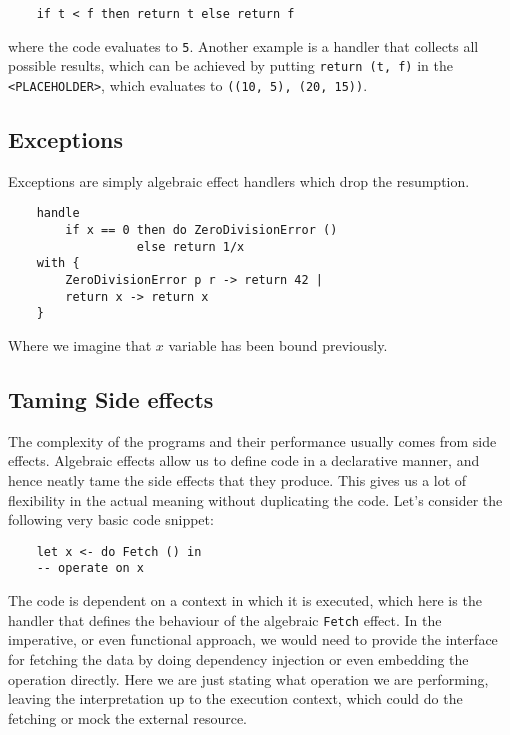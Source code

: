 \documentclass[declaration,shortabstract]{iithesis}
\theoremstyle{definition} \newtheorem{definition}{Definition}[chapter]
\theoremstyle{remark} \newtheorem{remark}[definition]{Observation}
\theoremstyle{plain} \newtheorem{theorem}[definition]{Theorem}
\theoremstyle{plain} \newtheorem{lemma}[definition]{Lemma}
\begin{document}
\begin{verbatim}
    if t < f then return t else return f
\end{verbatim}
    where the code evaluates to \verb!5!. Another example is a handler that
    collects all possible results, which can be achieved by putting
    \verb!return (t, f)! in the \verb!<PLACEHOLDER>!, which evaluates to
    \verb!((10, 5), (20, 15))!.

    \subsection{Exceptions}

    Exceptions are simply algebraic effect handlers which drop the resumption.

\begin{verbatim}
    handle
        if x == 0 then do ZeroDivisionError ()
                  else return 1/x
    with {
        ZeroDivisionError p r -> return 42 |
        return x -> return x
    }
\end{verbatim}
    Where we imagine that $x$ variable has been bound previously.

    \subsection{Taming Side effects}

    The complexity of the programs and their performance usually comes from side effects.
    Algebraic effects allow us to define code in a declarative manner, and hence
    neatly tame the side effects that they produce. This gives us a lot of flexibility
    in the actual meaning without duplicating the code. Let's consider the following
    very basic code snippet:

\begin{verbatim}
    let x <- do Fetch () in
    -- operate on x
\end{verbatim}

    The code is dependent on a context in which it is executed, which here is
    the handler that defines the behaviour of the algebraic \verb!Fetch! effect.
    In the imperative, or even functional approach, we would need to provide
    the interface for fetching the data by doing dependency injection or even
    embedding the operation directly. Here we are just stating what operation
    we are performing, leaving the interpretation up to the execution context,
    which could do the fetching or mock the external resource.
\end{document}
